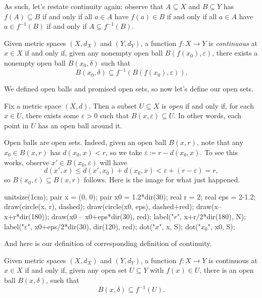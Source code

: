\documentclass[../notes.tex]{subfiles}
\begin{document}
As such, let's restate continuity again: observe that $A\subseteq X$ and $B\subseteq Y$ has $f(A)\subseteq B$ if and only if all $a\in A$ have $f(a)\in B$ if and only if all $a\in A$ have $a\in f^{-1}(B)$ if and only if $A\subseteq f^{-1}(B)$.
\begin{defihelper}[Continuous]
	Given metric spaces $(X,d_X)$ and $(Y,d_Y)$, a function $f\colon X\to Y$ is \textit{continuous} at $x\in X$ if and only if, given any nonempty open ball $B(f(x_0),\varepsilon)$, there exists a nonempty open ball $B(x_0,\delta)$ such that
	\[B(x_0,\delta)\subseteq f^{-1}(B(f(x_0),\varepsilon)).\]
\end{defihelper}
We defined open balls and promised open sets, so now let's define our open sets.
\begin{definition}
	Fix a metric space $(X,d)$. Then a subset $U\subseteq X$ is \textit{open} if and only if, for each $x\in U$, there exists some $\varepsilon>0$ such that $B(x,\varepsilon)\subseteq U$. In other words, each point in $U$ has an open ball around it.
\end{definition}
\begin{example} \label{ex:openballisopen}
	Open balls are open sets. Indeed, given an open ball $B(x,r)$, note that any $x_0\in B(x,r)$ has $d(x_0,x)<r$, so we take $\varepsilon\coloneqq r-d(x_0,x)$. To see this works, observe $x'\in B(x_0,\varepsilon)$ will have
	\[d(x',x)\le d(x',x_0)+d(x_0,x)<\varepsilon+(r-\varepsilon)=r,\]
	so $B(x_0,\varepsilon)\subseteq B(x,r)$ follows. Here is the image for what just happened.
	\begin{center}
		\begin{asy}
			unitsize(1cm);
			pair x = (0, 0);
			pair x0 = 1.2*dir(30);
			real r = 2;
			real eps = 2-1.2;
			draw(circle(x, r), dashed);
			draw(circle(x0, eps), dashed+red);
			draw(x--x+r*dir(180));
			draw(x0 -- x0+eps*dir(30), red);
			label("$r$", x+r/2*dir(180), N);
			label("$\varepsilon$", x0+eps/2*dir(30), dir(120), red);
			dot("$x$", x, S);
			dot("$x_0$", x0, S);
		\end{asy}
	\end{center}
\end{example}
And here is our definition of corresponding definition of continuity.
\begin{lemma} \label{lem:goodcont1}
	Given metric spaces $(X,d_X)$ and $(Y,d_Y)$, a function $f\colon X\to Y$ is continuous at $x\in X$ if and only if, given any open set $U\subseteq Y$ with $f(x)\in U$, there is an open ball $B(x,\delta)$, such that
	\[B(x,\delta)\subseteq f^{-1}(U).\]
\end{lemma}
\end{document}
